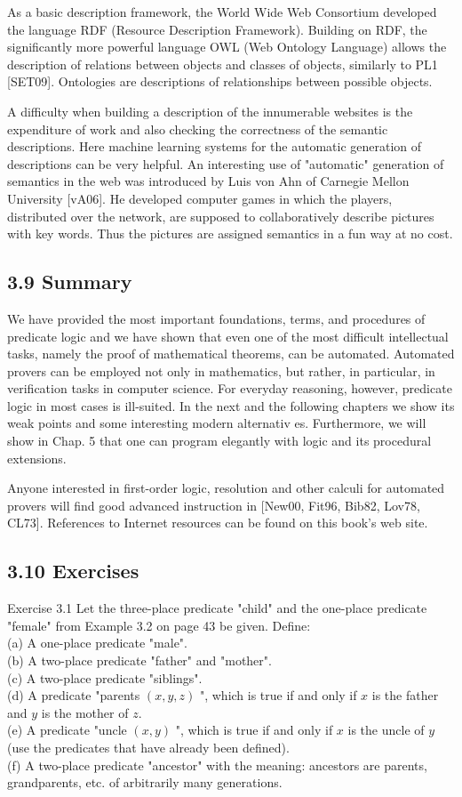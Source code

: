 \documentclass[10pt]{article}
\begin{document}
As a basic description framework, the World Wide Web Consortium developed the language RDF (Resource Description Framework). Building on RDF, the significantly more powerful language OWL (Web Ontology Language) allows the description of relations between objects and classes of objects, similarly to PL1 [SET09]. Ontologies are descriptions of relationships between possible objects.

A difficulty when building a description of the innumerable websites is the expenditure of work and also checking the correctness of the semantic descriptions. Here machine learning systems for the automatic generation of descriptions can be very helpful. An interesting use of "automatic" generation of semantics in the web was introduced by Luis von Ahn of Carnegie Mellon University [vA06]. He developed computer games in which the players, distributed over the network, are supposed to collaboratively describe pictures with key words. Thus the pictures are assigned semantics in a fun way at no cost.

\subsection*{3.9 Summary}
We have provided the most important foundations, terms, and procedures of predicate logic and we have shown that even one of the most difficult intellectual tasks, namely the proof of mathematical theorems, can be automated. Automated provers can be employed not only in mathematics, but rather, in particular, in verification tasks in computer science. For everyday reasoning, however, predicate logic in most cases is ill-suited. In the next and the following chapters we show its weak points and some interesting modern alternativ
es. Furthermore, we will show in Chap. 5 that one can program elegantly with logic and its procedural extensions.

Anyone interested in first-order logic, resolution and other calculi for automated provers will find good advanced instruction in [New00, Fit96, Bib82, Lov78, CL73]. References to Internet resources can be found on this book's web site.

\subsection*{3.10 Exercises}
Exercise 3.1 Let the three-place predicate "child" and the one-place predicate "female" from Example 3.2 on page 43 be given. Define:\\
(a) A one-place predicate "male".\\
(b) A two-place predicate "father" and "mother".\\
(c) A two-place predicate "siblings".\\
(d) A predicate "parents $(x, y, z)$ ", which is true if and only if $x$ is the father and $y$ is the mother of $z$.\\
(e) A predicate "uncle $(x, y)$ ", which is true if and only if $x$ is the uncle of $y$ (use the predicates that have already been defined).\\
(f) A two-place predicate "ancestor" with the meaning: ancestors are parents, grandparents, etc. of arbitrarily many generations.
\end{document}
